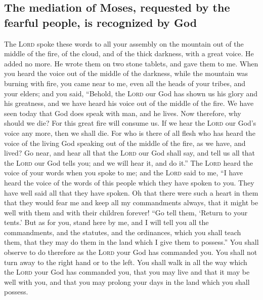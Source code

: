 \hypertarget{the-mediation-of-moses-requested-by-the-fearful-people-is-recognized-by-god}{%
\subsection{The mediation of Moses, requested by the fearful people, is
recognized by
God}\label{the-mediation-of-moses-requested-by-the-fearful-people-is-recognized-by-god}}

 The \textsc{Lord} spoke these words to all your assembly
on the mountain out of the middle of the fire, of the cloud, and of the
thick darkness, with a great voice. He added no more. He wrote them on
two stone tablets, and gave them to me.  When you heard
the voice out of the middle of the darkness, while the mountain was
burning with fire, you came near to me, even all the heads of your
tribes, and your elders;  and you said, ``Behold, the
\textsc{Lord} our God has shown us his glory and his greatness, and we
have heard his voice out of the middle of the fire. We have seen today
that God does speak with man, and he lives.  Now
therefore, why should we die? For this great fire will consume us. If we
hear the \textsc{Lord} our God's voice any more, then we shall die.
 For who is there of all flesh who has heard the voice of
the living God speaking out of the middle of the fire, as we have, and
lived?  Go near, and hear all that the \textsc{Lord} our
God shall say, and tell us all that the \textsc{Lord} our God tells you;
and we will hear it, and do it.''  The \textsc{Lord}
heard the voice of your words when you spoke to me; and the
\textsc{Lord} said to me, ``I have heard the voice of the words of this
people which they have spoken to you. They have well said all that they
have spoken.  Oh that there were such a heart in them
that they would fear me and keep all my commandments always, that it
might be well with them and with their children forever! 
``Go tell them, `Return to your tents.'  But as for you,
stand here by me, and I will tell you all the commandments, and the
statutes, and the ordinances, which you shall teach them, that they may
do them in the land which I give them to possess.''  You
shall observe to do therefore as the \textsc{Lord} your God has
commanded you. You shall not turn away to the right hand or to the left.
 You shall walk in all the way which the \textsc{Lord}
your God has commanded you, that you may live and that it may be well
with you, and that you may prolong your days in the land which you shall
possess.

